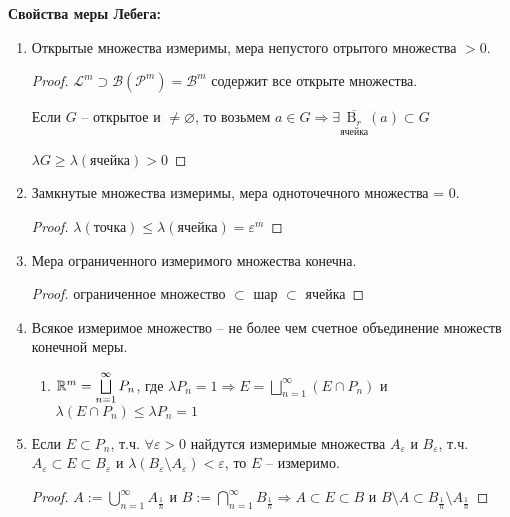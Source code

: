 \textbf{Свойства меры Лебега:}
\begin{enumerate}
    \item Открытые множества измеримы, мера непустого отрытого множества $>0$.
    
    \begin{proof}
        $\mathcal{L}^m\supset \mathcal{B}(\mathcal{P}^m)=\mathcal{B}^m$ содержит все открыте множества.

        Если $G$ – открытое и $\not = \varnothing$, то возьмем $a\in G\Rightarrow
        \exists \underset{\text{ячейка}}{\overline{\text{B}_r}}(a)\subset G$

        $\lambda G\geq \lambda (\text{ячейка})>0$
    \end{proof}
    \item Замкнутые множества измеримы, мера одноточечного множества = 0.
    
    \begin{proof}
        $\lambda(\text{точка})\leq \lambda (\text{ячейка}) =\varepsilon^m$
    \end{proof}

    \item Мера ограниченного измеримого множества конечна.
    
    \begin{proof}
        ограниченное множество $\subset$ шар $\subset$ ячейка
    \end{proof}

    \item Всякое измеримое множество – не более чем счетное объединение множеств конечной меры.
    
    \begin{enumerate}
        \item $\mathbb{R}^m =\bigsqcup\limits_{n=1}^\infty P_n$, где $\lambda P_n = 1\Rightarrow E =\bigsqcup\limits_{n=1}^\infty (E\cap P_n)$ и
        $\lambda (E\cap P_n)\leq \lambda P_n = 1$
    \end{enumerate}

    \item Если $E\subset P_n$, т.ч. $\forall \varepsilon > 0$ найдутся измеримые множества
    $A_\varepsilon$ и $B_\varepsilon$, т.ч. $A_\varepsilon\subset E \subset B_\varepsilon$ и 
    $\lambda (B_\varepsilon\setminus A_\varepsilon)< \varepsilon$, то $E$ – измеримо.
    
    \begin{proof}
        $A:=\bigcup\limits_{n=1}^\infty A_{\frac{1}{n}}$ и $B:=\bigcap\limits_{n=1}^\infty B_{\frac{1}{n}}\Rightarrow
        A\subset E \subset B$ и $B\setminus A \subset B_{\frac{1}{n}}\setminus A_{\frac{1}{n}}$


\end{proof}
\end{enumerate}
